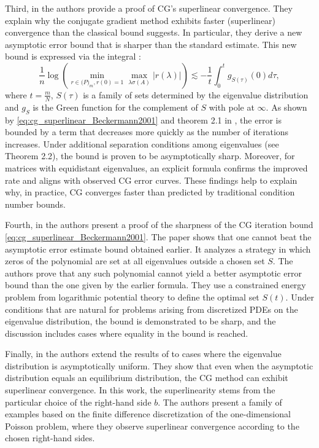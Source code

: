 Third, in \cite{cg_superlinear_Beckermann2001} the authors provide a proof of CG's superlinear convergence. They explain why the conjugate gradient method exhibits faster (superlinear) convergence than the classical bound suggests. In particular, they derive a new asymptotic error bound that is sharper than the standard estimate. This new bound is expressed via the integral \cite[Equation 1.8]{cg_superlinear_Beckermann2001}:
\begin{equation}
    \frac{1}{n} \log \left(\min_{r\in\mathcal(P)_m, r(0)=1}\max_{\lambda \sigma(A)}|r(\lambda)|\right) \lesssim-\frac{1}{t} \int_0^t g_{S(\tau)}(0) d \tau,
    \label{eq:cg_superlinear_Beckermann2001}
\end{equation}
where $t = \frac{m}{N}$, $S(\tau)$ is a family of sets determined by the eigenvalue distribution and $g_S$ is the Green function for the complement of $S$ with pole at $\infty$. As shown by \cref{eq:cg_superlinear_Beckermann2001} and theorem 2.1 in \cite{cg_sharp_bound_Beckermann2001}, the error is bounded by a term that decreases more quickly as the number of iterations increases. Under additional separation conditions among eigenvalues (see Theorem 2.2), the bound is proven to be asymptotically sharp. Moreover, for matrices with equidistant eigenvalues, an explicit formula \cite[Corollary 3.2 and Equation 3.11]{cg_superlinear_Beckermann2001} confirms the improved rate and aligns with observed CG error curves. These findings help to explain why, in practice, CG converges faster than predicted by traditional condition number bounds.

Fourth, in \cite{cg_sharp_bound_Beckermann2001} the authors present a proof of the sharpness of the CG iteration bound \cref{eq:cg_superlinear_Beckermann2001}. The paper shows that one cannot beat the asymptotic error estimate bound obtained earlier. It analyzes a strategy in which zeros of the polynomial are set at all eigenvalues outside a chosen set \(S\). The authors prove that any such polynomial cannot yield a better asymptotic error bound than the one given by the earlier formula. They use a constrained energy problem from logarithmic potential theory to define the optimal set \(S(t)\). Under conditions that are natural for problems arising from discretized PDEs on the eigenvalue distribution, the bound is demonstrated to be sharp, and the discussion includes cases where equality in the bound is reached.

Finally, in \cite{cg_superlinear_rhs_Beckermann2002} the authors extend the results of \cite{cg_superlinear_Beckermann2001} to cases where the eigenvalue distribution is asymptotically uniform. They show that even when the asymptotic distribution equals an equilibrium distribution, the CG method can exhibit superlinear convergence. In this work, the superlinearity stems from the particular choice of the right-hand side \(b\). The authors present a family of examples based on the finite difference discretization of the one-dimensional Poisson problem, where they observe superlinear convergence according to the chosen right-hand sides.
